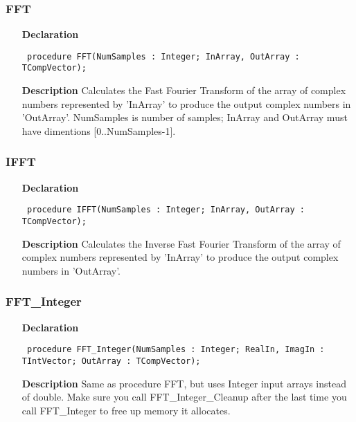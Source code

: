 \documentclass[12pt,a4paper,oneside]{report}
\newcommand{\declarationitem}[1]{\textbf{#1}}
\newcommand{\descriptiontitle}[1]{\textbf{#1}}
\newcommand{\code}[1]{\texttt{#1}}
\begin{document}
\subsubsection{FFT}
\label{ufft-FFT}
\begin{itemize}\item[\declarationitem{Declaration}\hfill]
	\begin{flushleft}
		\code{
			procedure FFT(NumSamples : Integer; InArray, OutArray : TCompVector);}
		
	\end{flushleft}
	
	\par
	\item[\descriptiontitle{Description}]
	Calculates the Fast Fourier Transform of the array of complex numbers represented by 'InArray' to produce the output complex numbers in 'OutArray'. NumSamples is number of samples; InArray and OutArray must have dimentions [0..NumSamples-1].
	
\end{itemize}
\subsubsection{IFFT}
\label{ufft-IFFT}
\begin{itemize}\item[\declarationitem{Declaration}\hfill]
	\begin{flushleft}
		\code{
			procedure IFFT(NumSamples : Integer; InArray, OutArray : TCompVector);}
		
	\end{flushleft}
	
	\par
	\item[\descriptiontitle{Description}]
	Calculates the Inverse Fast Fourier Transform of the array of complex numbers represented by 'InArray' to produce the output complex numbers in 'OutArray'.
	
\end{itemize}
\subsubsection{FFT{\_}Integer}
\label{ufft-FFT_Integer}
\begin{itemize}\item[\declarationitem{Declaration}\hfill]
	\begin{flushleft}
		\code{
			procedure FFT{\_}Integer(NumSamples : Integer; RealIn, ImagIn : TIntVector; OutArray : TCompVector);}
		
	\end{flushleft}
	
	\par
	\item[\descriptiontitle{Description}]
	Same as procedure FFT, but uses Integer input arrays instead of double. Make sure you call FFT{\_}Integer{\_}Cleanup after the last time you call FFT{\_}Integer to free up memory it allocates.
	
\end{itemize}
\end{document}
